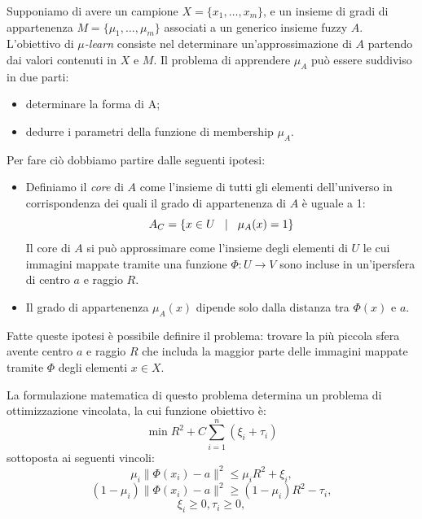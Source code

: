 \documentclass[a4paper,12pt]{report}
\begin{document}
Supponiamo di avere un campione $X = \{x_1,\dots,x_m\}$, e un insieme di gradi di appartenenza $ M = \{\mu_1,\dots,\mu_m\}$ associati a un generico insieme fuzzy $A$. L'obiettivo di \textit{$\mu$-learn} consiste nel determinare un'approssimazione di $A$ partendo dai valori contenuti in $X$ e $M$.
Il problema di apprendere $\mu_A$ può essere suddiviso in due parti:
\begin{itemize}
    \item determinare la forma di A;
    \item dedurre i parametri della funzione di membership $\mu_A$.
\end{itemize}

\noindent Per fare ciò dobbiamo partire dalle seguenti ipotesi:
\begin{itemize}
    \item  Definiamo il \textit{core} di $A$ come l'insieme di tutti gli elementi dell'universo in corrispondenza dei quali il grado di appartenenza di $A$ è uguale a 1:
    \begin{equation*}
        A_C = \{ x\in U \hspace{0,3cm} |\hspace{0,3cm} \mu_A(x) = 1 \}
    \end{equation*}
    \noindent Il core di $A$ si può approssimare come l'insieme degli elementi di $U$ le cui immagini mappate tramite una funzione $\Phi: U \to V$ sono incluse in un'ipersfera di centro $a$ e raggio $R$.

    \item Il grado di appartenenza $\mu_A(x)$ dipende solo dalla distanza tra $\Phi(x)$ e $a$.
\end{itemize}

\noindent Fatte queste ipotesi è possibile definire il problema: trovare la più piccola sfera avente centro $a$ e raggio $R$ che includa la maggior parte delle immagini mappate tramite $\Phi$ degli elementi $x\in X$.



La formulazione matematica di questo problema determina un problema di ottimizzazione vincolata, la cui funzione obiettivo è:
\begin{equation}
    \min R^2 + C\displaystyle\sum_{i=1}^{n}(\xi_i+\tau_i)
    \label{eq:Problema_di_partenza}
\end{equation}
sottoposta ai seguenti vincoli:
\begin{equation}
    \mu_i\|\Phi(x_i)-a\|^2\le\mu_iR^2 + \xi_i,
    \label{eq:vincolo_1}
\end{equation}
\begin{equation}
    (1-\mu_i)\|\Phi(x_i)-a\|^2 \ge (1-\mu_i)R^2 - \tau_i,
    \label{eq:vincolo_2}
\end{equation}
\begin{equation}
    \xi_i \ge 0, \tau_i \ge 0,
    \label{eq:vincolo_3}
\end{equation}
\end{document}
